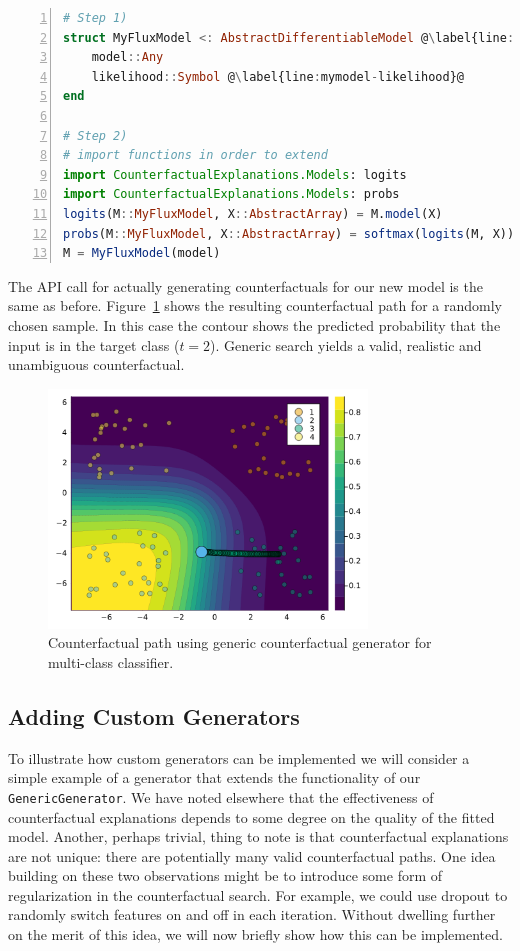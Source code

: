 \documentclass[
  letterpaper,
  DIV=11,
  numbers=noendperiod]{scrartcl}
\begin{document}
\begin{lstlisting}[language=Julia, escapechar=@, numbers=left, label={lst:mymodel}, caption={}]
# Step 1)
struct MyFluxModel <: AbstractDifferentiableModel @\label{line:mymodel-subtype}@
    model::Any
    likelihood::Symbol @\label{line:mymodel-likelihood}@
end

# Step 2)
# import functions in order to extend
import CounterfactualExplanations.Models: logits
import CounterfactualExplanations.Models: probs 
logits(M::MyFluxModel, X::AbstractArray) = M.model(X)
probs(M::MyFluxModel, X::AbstractArray) = softmax(logits(M, X))
M = MyFluxModel(model)
\end{lstlisting}

The API call for actually generating counterfactuals for our new model
is the same as before. Figure~\ref{fig-multi} shows the resulting
counterfactual path for a randomly chosen sample. In this case the
contour shows the predicted probability that the input is in the target
class (\(t=2\)). Generic search yields a valid, realistic and
unambiguous counterfactual.

\begin{figure}

{\centering \includegraphics[width=3.33333in,height=2.5in]{www/ce_multi.png}

}

\caption{\label{fig-multi}Counterfactual path using generic
counterfactual generator for multi-class classifier.}

\end{figure}

\hypertarget{sec-custom-gen}{%
\subsection{Adding Custom Generators}\label{sec-custom-gen}}

To illustrate how custom generators can be implemented we will consider
a simple example of a generator that extends the functionality of our
\texttt{GenericGenerator}. We have noted elsewhere that the
effectiveness of counterfactual explanations depends to some degree on
the quality of the fitted model. Another, perhaps trivial, thing to note
is that counterfactual explanations are not unique: there are
potentially many valid counterfactual paths. One idea building on these
two observations might be to introduce some form of regularization in
the counterfactual search. For example, we could use dropout to randomly
switch features on and off in each iteration. Without dwelling further
on the merit of this idea, we will now briefly show how this can be
implemented.
\end{document}
